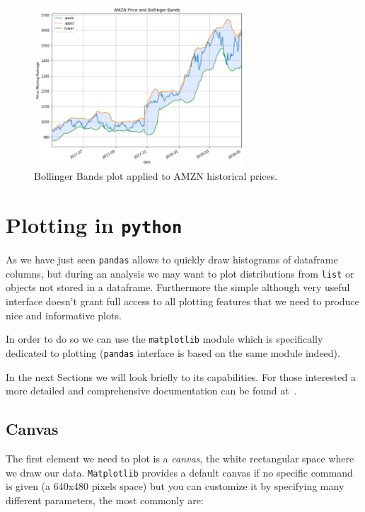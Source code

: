 \begin{ipython}
\begin{figure}[htb]
	\centering
	\includegraphics[width=0.7\textwidth]{figures/bollinger_bands}
	\caption{Bollinger Bands plot applied to AMZN historical prices.}
	\label{fig:bollinger_bands}
\end{figure}

\section{Plotting in \texttt{python}}\label{plotting-in-python}

As we have just seen \texttt{pandas} allows to quickly draw histograms of dataframe columns, but during an analysis we may want to plot distributions from \texttt{list} or objects not stored in a dataframe. Furthermore the simple although very useful interface doesn't grant full access to all plotting features that we need to produce nice and informative plots.

In order to do so we can use the \texttt{matplotlib} module which is specifically dedicated to plotting (\texttt{pandas} interface is based on the same module indeed). 

In the next Sections we will look briefly to its capabilities. For those interested a more detailed and comprehensive documentation can be found at~\cite{matplotlib}.

\subsection{Canvas}\label{canvas}

The first element we need to plot is a \emph{canvas}, the white rectangular space where we draw our data. \texttt{Matplotlib} provides a default canvas if no specific command is given (a 640x480 pixels space) but you can customize it by specifying many different parameters, the most commonly are:


\end{ipython}
